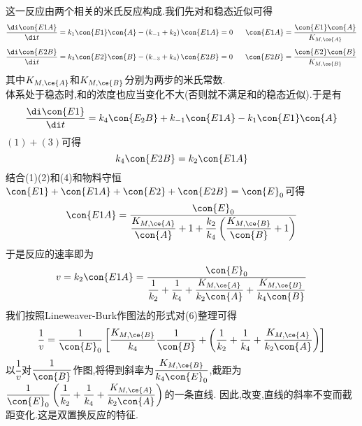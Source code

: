 \documentclass{ctexart}
\begin{document}
\begin{derivation}\setcounter{equation}{0}
    这一反应由两个相关的米氏反应构成.我们先对和稳态近似可得
    \begin{equation}
        \dfrac{\di\con{E1A}}{\di t}=k_1\con{E1}\con{A}-\left(k_{-1}+k_2\right)\con{E1A}=0\ \ \ \ \ \con{E1A}=\dfrac{\con{E1}\con{A}}{K_{M,\ce{A}}}
    \end{equation}
    \begin{equation}
        \dfrac{\di\con{E2B}}{\di t}=k_3\con{E2}\con{B}-\left(k_{-3}+k_4\right)\con{E2B}=0\ \ \ \ \ \con{E2B}=\dfrac{\con{E2}\con{B}}{K_{M,\ce{B}}}
    \end{equation}
    其中$K_{M,\ce{A}}$和$K_{M,\ce{B}}$分别为两步的米氏常数.\\
    体系处于稳态时,和的浓度也应当变化不大(否则就不满足和的稳态近似).于是有
    \begin{equation}
        \dfrac{\di\con{E1}}{\di t}=k_4\con{E_2B}+k_{-1}\con{E1A}-k_1\con{E1}\con{A}
    \end{equation}
    $(1)+(3)$可得
    \begin{equation}
        k_4\con{E2B}=k_2\con{E1A}
    \end{equation}
    结合(1)(2)和(4)和物料守恒$\con{E1}+\con{E1A}+\con{E2}+\con{E2B}=\con{E}_0$可得
    \begin{equation}
        \con{E1A}=\dfrac{\con{E}_0}{\dfrac{K_{M,\ce{A}}}{\con{A}}+1+\dfrac{k_2}{k_4}\left(\dfrac{K_{M,\ce{B}}}{\con{B}}+1\right)}
    \end{equation}
    于是反应的速率即为
    \begin{equation}
        v=k_2\con{E1A}=\dfrac{\con{E}_0}{\dfrac{1}{k_2}+\dfrac{1}{k_4}+\dfrac{K_{M,\ce{A}}}{k_2\con{A}}+\dfrac{K_{M,\ce{B}}}{k_4\con{B}}}
    \end{equation}
    我们按照Lineweaver-Burk作图法的形式对(6)整理可得
    \begin{equation}
        \dfrac{1}{v}=\dfrac{1}{\con{E}_0}\left[\dfrac{K_{M,\ce{B}}}{k_4}\dfrac{1}{\con{B}}+\left(\dfrac{1}{k_2}+\dfrac{1}{k_4}+\dfrac{K_{M,\ce{A}}}{k_2\con{A}}\right)\right]
    \end{equation}
    以$\dfrac1v$对$\dfrac{1}{\con{B}}$作图,将得到斜率为$\dfrac{K_{M,\ce{B}}}{k_4\con{E}_0}$,截距为$\dfrac{1}{\con{E}_0}\left(\dfrac{1}{k_2}+\dfrac{1}{k_4}+\dfrac{K_{M,\ce{A}}}{k_2\con{A}}\right)$的一条直线.%
    因此,改变,直线的斜率不变而截距变化.这是双置换反应的特征.
\end{derivation}
\end{document}
